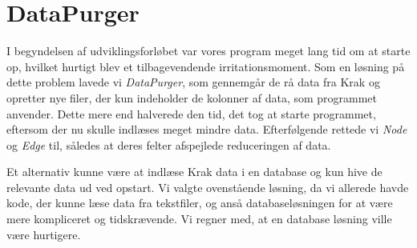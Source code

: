 \section{DataPurger}

I begyndelsen af udviklingsforløbet var vores program meget lang tid om at starte op, hvilket hurtigt blev et tilbagevendende irritationsmoment. Som en løsning på dette problem lavede vi \emph{DataPurger}, som gennemgår de rå data fra Krak og opretter nye filer, der kun indeholder de kolonner af data, som programmet anvender. Dette mere end halverede den tid, det tog at starte programmet, eftersom der nu skulle indlæses meget mindre data. Efterfølgende rettede vi \emph{Node} og \emph{Edge} til, således at deres felter afspejlede reduceringen af data.

Et alternativ kunne være at indlæse Krak data i en database og kun hive de relevante data ud ved opstart. Vi valgte ovenstående løsning, da vi allerede havde kode, der kunne læse data fra tekstfiler, og anså databaseløsningen for at være mere kompliceret og tidskrævende. Vi regner med, at en database løsning ville være hurtigere.